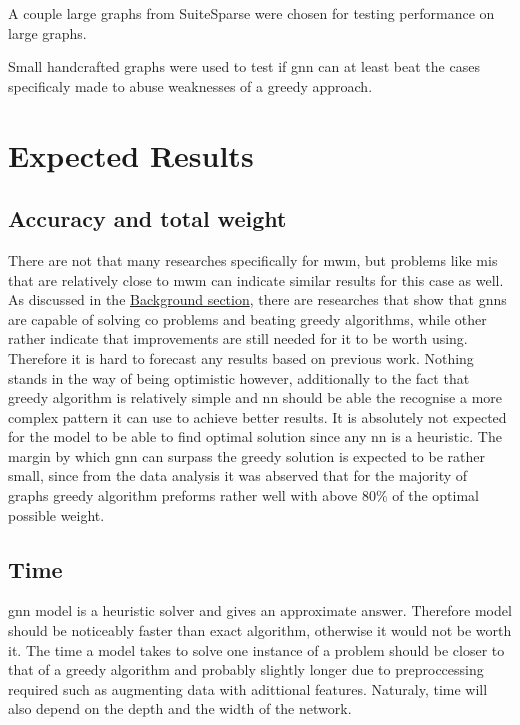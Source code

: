 A couple large graphs from SuiteSparse were chosen for testing performance on large graphs.

Small handcrafted graphs were used to test if \gls{gnn} can at least beat the cases specificaly made to abuse weaknesses of a greedy approach.

\section{Expected Results}

\subsection{Accuracy and total weight}

There are not that many researches specifically for \gls{mwm}, but problems like \gls{mis} that are relatively close to \gls{mwm} can indicate similar results for this case as well. As discussed in the \hyperref[sec:background]{Background section}, there are researches that show that \gls{gnn}s are capable of solving \gls{co} problems and beating greedy algorithms, while other rather indicate that improvements are still needed for it to be worth using. Therefore it is hard to forecast any results based on previous work. Nothing stands in the way of being optimistic however, additionally to the fact that greedy algorithm is relatively simple and \gls{nn} should be able the recognise a more complex pattern it can use to achieve better results. It is absolutely not expected for the model to be able to find optimal solution since any \gls{nn} is a heuristic. The margin by which \gls{gnn} can surpass the greedy solution is expected to be rather small, since from the data analysis it was abserved that for the majority of graphs greedy algorithm preforms rather well with above 80\% of the optimal possible weight.

\subsection{Time}

\gls{gnn} model is a heuristic solver and gives an approximate answer. Therefore model should be noticeably faster than exact algorithm, otherwise it would not be worth it. The time a model takes to solve one instance of a problem should be closer to that of a greedy algorithm and probably slightly longer due to preproccessing required such as augmenting data with adittional features. Naturaly, time will also depend on the depth and the width of the network.

